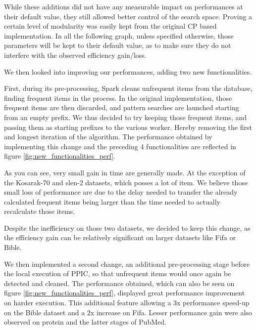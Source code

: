 \documentclass{eplmastersthesis}
\begin{document}
While these additions did not have any measurable impact on performances at their default value, they still allowed better control of the search space. Proving a certain level of modularity was easily kept from the original CP based implementation. In all the following graph, unless specified otherwise, those parameters will be kept to their default value, as to make sure they do not interfere with the observed efficiency gain/loss. \newline

We then looked into improving our performances, adding two new functionalities. \newline

First, during its pre-processing, Spark cleans unfrequent items from the database, finding frequent items in the process. In the original implementation, those frequent items are then discarded, and pattern searches are launched starting from an empty prefix. We thus decided to try keeping those frequent items, and passing them as starting prefixes to the various worker. Hereby removing the first and longest iteration of the algorithm. The performance obtained by implementing this change and the preceding 4 functionalities are reflected in figure \ref{fig:new_functionalities_perf}.
\newline

As you can see, very small gain in time are generally made. At the exception of the Kosarak-70 and slen-2 datasets, which posses a lot of item. We believe those small loss of performance are due to the delay needed to transfer the already calculated frequent items being larger than the time needed to actually recalculate those items. \newline

Despite the inefficiency on those two datasets, we decided to keep this change, as the efficiency gain can be relatively significant on larger datasets like Fifa or Bible.\newline

We then implemented a second change, an additional pre-processing stage before the local execution of PPIC, so that unfrequent items would once again be detected and cleaned. The performance obtained, which can also be seen on figure \ref{fig:new_functionalities_perf}, displayed great performance improvement on harder execution. This additional feature allowing a 3x performance speed-up on the Bible dataset and a 2x increase on Fifa. Lesser performance gain were also observed on protein and the latter stages of PubMed. \newline
\end{document}
